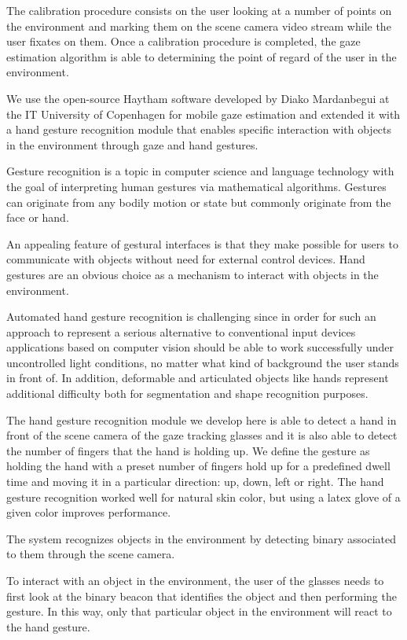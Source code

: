 \documentclass[10pt,a4paper]{article}
\begin{document}
The calibration procedure consists on the user looking at a number of points on the environment and marking them on
the scene camera video stream while the user fixates on them.  Once a calibration procedure is completed, the gaze
estimation algorithm is able to determining the point of regard of the user in the environment.

We use the open-source Haytham \cite{Mardanbegi2011} software developed by Diako Mardanbegui at the IT University of
Copenhagen for mobile gaze estimation and extended it with a hand gesture recognition module that enables specific
interaction with objects in the environment through gaze and hand gestures.

Gesture recognition is a topic in computer science and language technology with the goal of interpreting human gestures
via mathematical algorithms. Gestures can originate from any bodily motion or state but commonly originate from the face
or hand.

An appealing feature of gestural interfaces is that they make possible for users to communicate with objects
without need for external control devices. Hand gestures are an obvious choice as a mechanism to interact with objects
in the environment. 

Automated hand gesture recognition is challenging since in order for such an approach to represent a serious alternative
to conventional input devices applications based on computer vision should be able to work successfully under
uncontrolled light conditions, no matter what kind of background the user stands in front of. In addition, deformable
and articulated objects like hands represent additional difficulty both for segmentation and shape recognition
purposes.

The hand gesture recognition module we develop here is able to detect a hand in front of the scene camera of the gaze
tracking glasses and it is also able to detect the number of fingers that the hand is holding up. We define the gesture
as holding the hand with a preset number of fingers hold up  for a predefined dwell time and moving it in a particular
direction: up, down, left  or right. The hand gesture recognition worked well for natural skin color, but using a latex glove of a
given color improves performance.

The system recognizes objects in the environment by detecting binary associated to them through the scene camera.

To interact with an object in the environment, the user of the glasses needs to first look at the binary beacon that
identifies the object and then performing the gesture. In this way, only that particular object in the environment 
will react to the hand gesture.
\end{document}

